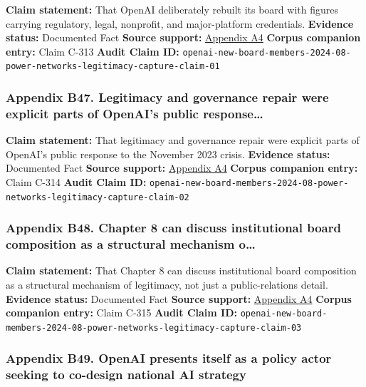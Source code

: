 \documentclass[
  american,
  11pt,
  letterpaper,
]{article}
\begin{document}
\textbf{Claim statement:} That OpenAI deliberately rebuilt its board
with figures carrying regulatory, legal, nonprofit, and major-platform
credentials. \textbf{Evidence status:} Documented Fact \textbf{Source
support:}
\hyperref[appendix-a4-openai-announces-new-members-to-board-of-directors]{Appendix
A4} \textbf{Corpus companion entry:} Claim C-313 \textbf{Audit Claim
ID:}
\texttt{openai-new-board-members-2024-08-power-networks-legitimacy-capture-claim-01}

\subsubsection{Appendix B47. Legitimacy and governance repair were
explicit parts of OpenAI's public
response\ldots{}}\label{appendix-b47-legitimacy-and-governance-repair-were-explicit-parts-of-openai-s-public-response}

\textbf{Claim statement:} That legitimacy and governance repair were
explicit parts of OpenAI's public response to the November 2023 crisis.
\textbf{Evidence status:} Documented Fact \textbf{Source support:}
\hyperref[appendix-a4-openai-announces-new-members-to-board-of-directors]{Appendix
A4} \textbf{Corpus companion entry:} Claim C-314 \textbf{Audit Claim
ID:}
\texttt{openai-new-board-members-2024-08-power-networks-legitimacy-capture-claim-02}

\subsubsection{Appendix B48. Chapter 8 can discuss institutional board
composition as a structural mechanism
o\ldots{}}\label{appendix-b48-chapter-8-can-discuss-institutional-board-composition-as-a-structural-mechanism-o}

\textbf{Claim statement:} That Chapter 8 can discuss institutional board
composition as a structural mechanism of legitimacy, not just a
public-relations detail. \textbf{Evidence status:} Documented Fact
\textbf{Source support:}
\hyperref[appendix-a4-openai-announces-new-members-to-board-of-directors]{Appendix
A4} \textbf{Corpus companion entry:} Claim C-315 \textbf{Audit Claim
ID:}
\texttt{openai-new-board-members-2024-08-power-networks-legitimacy-capture-claim-03}

\subsubsection{Appendix B49. OpenAI presents itself as a policy actor
seeking to co-design national AI
strategy}\label{appendix-b49-openai-presents-itself-as-a-policy-actor-seeking-to-co-design-national-ai-strategy}
\end{document}
